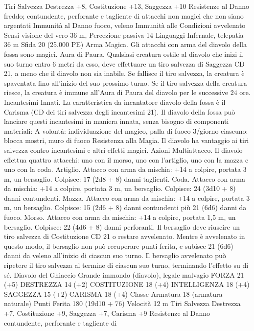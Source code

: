 \begin{multicols}{2}
Tiri Salvezza Destrezza +8, Costituzione +13, Saggezza +10
Resistenze al Danno freddo; contundente, perforante e tagliente
di attacchi non magici che non siano argentati
Immunità al Danno fuoco, veleno
Immunità alle Condizioni avvelenato
Sensi visione del vero 36 m, Percezione passiva 14
Linguaggi Infernale, telepatia 36 m
Sfida 20 (25.000 PE)
Arma Magica. Gli attacchi con arma del diavolo della fossa sono
magici.
Aura di Paura. Qualsiasi creatura ostile al diavolo che inizi il
suo turno entro 6 metri da esso, deve effettuare un tiro salvezza
di Saggezza CD 21, a meno che il diavolo non sia inabile. Se
fallisce il tiro salvezza, la creatura è spaventata fino all’inizio del
suo prossimo turno. Se il tiro salvezza della creatura riesce, la
creatura è immune all’Aura di Paura del diavolo per le
successive 24 ore.
Incantesimi Innati. La caratteristica da incantatore diavolo della
fossa è il Carisma (CD dei tiri salvezza degli incantesimi 21). Il
diavolo della fossa può lanciare questi incantesimi in maniera
innata, senza bisogno di componenti materiali:
A volontà: individuazione del magico, palla di fuoco
3/giorno ciascuno: blocca mostri, muro di fuoco
Resistenza alla Magia. Il diavolo ha vantaggio ai tiri salvezza
contro incantesimi e altri effetti magici.
Azioni
Multiattacco. Il diavolo effettua quattro attacchi: uno con il
morso, uno con l’artiglio, uno con la mazza e uno con la coda.
Artiglio. Attacco con arma da mischia: +14 a colpire, portata 3
m, un bersaglio.
Colpisce: 17 (2d8 + 8) danni taglienti.
Coda. Attacco con arma da mischia: +14 a colpire, portata 3 m,
un bersaglio.
Colpisce: 24 (3d10 + 8) danni contundenti.
Mazza. Attacco con arma da mischia: +14 a colpire, portata 3 m,
un bersaglio.
Colpisce: 15 (2d6 + 8) danni contundenti più 21 (6d6) danni da
fuoco.
Morso. Attacco con arma da mischia: +14 a colpire, portata 1,5
m, un bersaglio.
Colpisce: 22 (4d6 + 8) danni perforanti. Il bersaglio deve riuscire
un tiro salvezza di Costituzione CD 21 o restare avvelenato.
Mentre è avvelenato in questo modo, il bersaglio non può
recuperare punti ferita, e subisce 21 (6d6) danni da veleno
all’inizio di ciascun suo turno. Il bersaglio avvelenato può
ripetere il tiro salvezza al termine di ciascun suo turno,
terminando l’effetto su di sé.
Diavolo del Ghiaccio
Grande immondo (diavolo), legale malvagio
FORZA 21 (+5)
DESTREZZA 14 (+2)
COSTITUZIONE 18 (+4)
INTELLIGENZA 18 (+4)
SAGGEZZA 15 (+2)
CARISMA 18 (+4)
Classe Armatura 18 (armatura naturale)
Punti Ferita 180 (19d10 + 76)
Velocità 12 m
Tiri Salvezza Destrezza +7, Costituzione +9, Saggezza +7,
Carisma +9
Resistenze al Danno contundente, perforante e tagliente di

\end{multicols}
